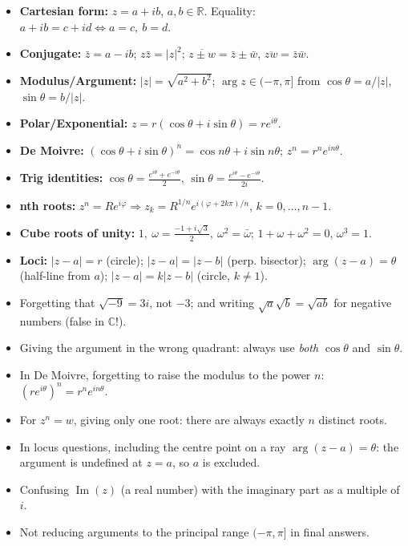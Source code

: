 \documentclass[11pt]{article}
\begin{document}
\begin{aretenir}
\begin{itemize}
\item \textbf{Cartesian form:} $z = a+ib$, $a,b\in\mathbb{R}$. Equality: $a+ib=c+id \iff a=c,\ b=d$.
\item \textbf{Conjugate:} $\bar{z}=a-ib$; $z\bar{z}=|z|^2$; $\overline{z\pm w}=\bar{z}\pm\bar{w}$, $\overline{zw}=\bar{z}\bar{w}$.
\item \textbf{Modulus/Argument:} $|z|=\sqrt{a^2+b^2}$; $\arg z\in(-\pi,\pi]$ from $\cos\theta=a/|z|$, $\sin\theta=b/|z|$.
\item \textbf{Polar/Exponential:} $z = r(\cos\theta+i\sin\theta) = re^{i\theta}$.
\item \textbf{De Moivre:} $(\cos\theta+i\sin\theta)^n = \cos n\theta+i\sin n\theta$; $z^n = r^n e^{in\theta}$.
\item \textbf{Trig identities:} $\cos\theta=\frac{e^{i\theta}+e^{-i\theta}}{2}$, $\sin\theta=\frac{e^{i\theta}-e^{-i\theta}}{2i}$.
\item \textbf{nth roots:} $z^n = Re^{i\varphi} \Rightarrow z_k = R^{1/n}e^{i(\varphi+2k\pi)/n}$, $k=0,\dots,n-1$.
\item \textbf{Cube roots of unity:} $1,\ \omega=\frac{-1+i\sqrt{3}}{2},\ \omega^2=\bar{\omega}$; $1+\omega+\omega^2=0$, $\omega^3=1$.
\item \textbf{Loci:} $|z-a|=r$ (circle); $|z-a|=|z-b|$ (perp. bisector); $\arg(z-a)=\theta$ (half-line from $a$); $|z-a|=k|z-b|$ (circle, $k\neq1$).
\end{itemize}
\end{aretenir}

\begin{attention}
\begin{itemize}
\item Forgetting that $\sqrt{-9} = 3i$, not $-3$; and writing $\sqrt{a}\sqrt{b} = \sqrt{ab}$ for negative numbers (false in $\mathbb{C}$!).
\item Giving the argument in the wrong quadrant: always use \emph{both} $\cos\theta$ and $\sin\theta$.
\item In De Moivre, forgetting to raise the modulus to the power $n$: $(re^{i\theta})^n = r^n e^{in\theta}$.
\item For $z^n = w$, giving only one root: there are always exactly $n$ distinct roots.
\item In locus questions, including the centre point on a ray $\arg(z - a) = \theta$: the argument is undefined at $z = a$, so $a$ is excluded.
\item Confusing $\operatorname{Im}(z)$ (a real number) with the imaginary part as a multiple of $i$.
\item Not reducing arguments to the principal range $(-\pi,\pi]$ in final answers.
\end{itemize}
\end{attention}
\end{document}
